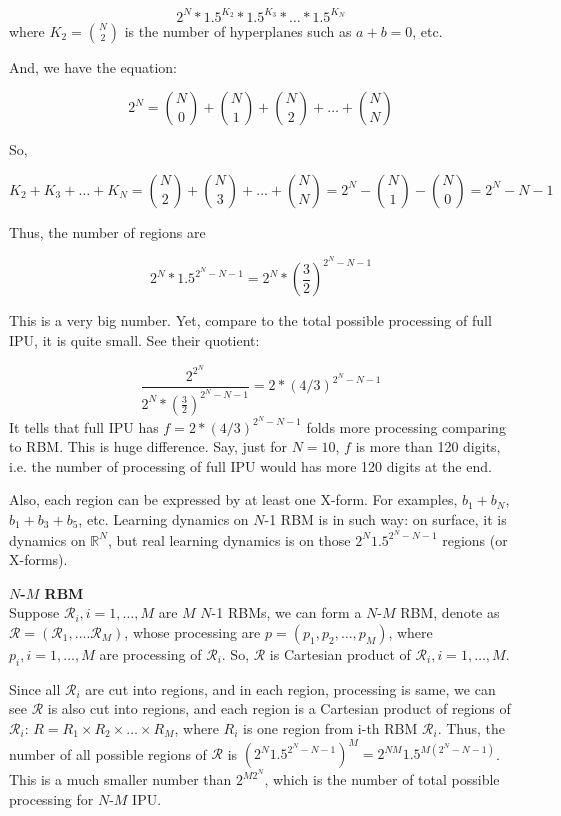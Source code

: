$$
2^N * 1.5^{K_2} * 1.5 ^{K_3} * \ldots * 1.5^{K_N}
$$
where ${K_2} = {N\choose 2}$ is the number of hyperplanes such as $a+b = 0$, etc. 

And, we have the equation:

\begin{equation}
2^N = {N\choose 0} +  {N\choose 1} +  {N\choose 2} + \ldots +  {N\choose N}   
\end{equation}

So, 

\begin{equation}
K_2 + K_3 + \ldots + K_N = {N\choose 2} +  {N\choose 3} + \ldots +  {N\choose N} = 2^N - {N\choose 1} -{N\choose 0}    = 2^N - N -1
\end{equation}

Thus, the number of regions are

$$
2^N * 1.5^{2^N-N-1} = 2^N * ({\frac{3}{2}})^{2^N-N-1} 
$$

This is a very big number. Yet, compare to the total possible processing of full IPU, it is quite small. See their quotient:

\[
\frac{2^{2^N}}{2^N * ({\frac{3}{2}})^{2^N-N-1} }   = 2* (4/3)^{2^N - N - 1}
\]
It tells that full IPU has $f = 2* (4/3)^{2^N - N - 1}$ folds more processing comparing to RBM. This is huge difference. Say, just for $N = 10$, $f$ is more than 120 digits, i.e. the number of processing of full IPU would has more 120 digits at the end.




Also, each region can be expressed by at least one X-form. For examples, $b_1 + b_N$, $b_1 + b_3 + b_5$, etc. Learning dynamics on $N$-1 RBM is in such way: on surface, it is dynamics on $\mathbb{R}^N$, but real learning dynamics is on those  $2^N 1.5^{2^N-N-1}$ regions (or X-forms). 
\bigskip



{\bf $N$-$M$ RBM} \\
Suppose $\mathcal{R}_i, i=1, \ldots, M$ are $M$ $N$-1 RBMs, we can form a $N$-$M$ RBM, denote as $\mathcal{R} = (\mathcal{R}_1, \ldots. \mathcal{R}_M)$, whose processing are  $p = (p_1, p_2, \ldots, p_M)$, where $p_i, i = 1, \ldots, M$ are processing of $\mathcal{R}_i$. So, $\mathcal{R}$ is Cartesian product of $\mathcal{R}_i, i=1, \ldots, M$. 

Since all $\mathcal{R}_i$ are cut into regions, and in each region, processing is same, we can see $\mathcal{R}$ is also cut into regions, and each region is a Cartesian product of regions of $\mathcal{R}_i$: $R = R_1 \times R_2 \times \ldots \times R_M$, where $R_i$ is one region from i-th RBM $\mathcal{R}_i$. Thus, the number of all possible regions of $\mathcal{R}$ is $(2^N 1.5^{2^N-N-1})^M = 2^{NM} 1.5^{M(2^N-N-1)}$. This is a much smaller number than $2^{M2^N}$, which is the number of total possible processing for $N$-$M$ IPU. 

